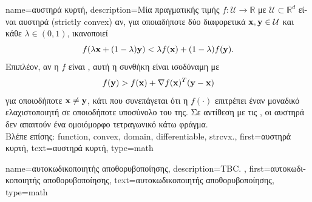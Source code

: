 {name={\foreignlanguage{greek}{αυστηρά κυρτή}},
	description={\foreignlanguage{greek}{Μία}  \foreignlanguage{greek}{πραγματικής 
		τιμής $f: \mathcal{U} \to \mathbb{R}$ με}   $\mathcal{U} \subset  \mathbb{R}^d$ 
		\foreignlanguage{greek}{είναι αυστηρά}  (strictly convex) \foreignlanguage{greek}{αν, για οποιαδήποτε δύο διαφορετικά 
		${\bf x},{\bf y} \in \mathcal{U}$ και κάθε $\lambda\in(0,1)$, ικανοποιεί} \cite[\foreignlanguage{greek}{Ορισμός} 3.1.1]{BoydConvexBook}
		\[
			f(\lambda{\bf x}+(1-\lambda){\bf y})
			< \lambda f({\bf x})+(1-\lambda)f({\bf y}).
		\]
		\foreignlanguage{greek}{Επιπλέον, αν η $f$ είναι} , \foreignlanguage{greek}{αυτή η συνθήκη είναι ισοδύναμη με}
		\[
			f({\bf y}) > f({\bf x}) + \nabla f({\bf x})^{T}({\bf y}-{\bf x})
		\]
		\foreignlanguage{greek}{για οποιοδήποτε ${\bf x}\neq{\bf y}$, κάτι που συνεπάγεται ότι η $f(\cdot)$ επιτρέπει έναν μοναδικό 
		ελαχιστοποιητή σε οποιοδήποτε}  \foreignlanguage{greek}{υποσύνολο του}  
		\foreignlanguage{greek}{της. Σε αντίθεση με τις}  , \foreignlanguage{greek}{οι αυστηρά} 
		  \foreignlanguage{greek}{δεν απαιτούν ένα ομοιόμορφο τετραγωνικό κάτω φράγμα}.
					\\ 
		\foreignlanguage{greek}{Βλέπε επίσης:} \gls{function}, \gls{convex}, \gls{domain}, \gls{differentiable}, \gls{strcvx}.},
	first={\foreignlanguage{greek}{αυστηρά κυρτή}},
	text={\foreignlanguage{greek}{αυστηρά κυρτή}},
	type=math
}

{name={\foreignlanguage{greek}{αυτοκωδικοποιητής αποθορυβοποίησης}},
	description={TBC. }, 
    	first={\foreignlanguage{greek}{αυτοκωδικοποιητής αποθορυβοποίησης}},
    	text={\foreignlanguage{greek}{αυτοκωδικοποιητής αποθορυβοποίησης}},
	type=math
}

